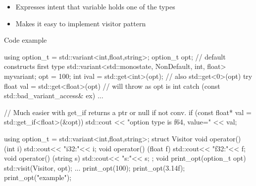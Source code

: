 \begin{frame}[fragile]
  \begin{itemize}
  \item Expresses intent that variable holds one of the types
  \item Makes it easy to implement visitor pattern
  \end{itemize}

  \begin{exampleblock}{Code example}
    \begin{cppcode*}{}
      using option_t = std::variant<int,float,string>;
      option_t opt; // default constructs first type
      std::variant<std::monostate, NonDefault, int, float> myvariant;
      opt = 100;
      int ival = std::get<int>(opt); // also std::get<0>(opt)
      try {
        float val = std::get<float>(opt) // will throw as opt is int
      } catch (const std::bad_variant_access& ex) {...}

      // Much easier with get_if returns a ptr or null if not conv.
      if (const float* val = std::get_if<float>(&opt))
          std::cout << "option type is f64, value=" << val;
    \end{cppcode*}
  \end{exampleblock}

\end{frame}

\begin{frame}[fragile]
    \begin{cppcode*}{}
      using option_t = std::variant<int,float,string>;
      struct Visitor {
        void operator() (int i) { std::cout<< "i32:"<< i;}
        void operator() (float f) { std::cout<< "f32:"<< f;}
        void operator() (string s) { std::cout<< "s:"<< s;}
      };
      void print_opt(option_t opt) {
        std::visit(Visitor{}, opt);
      }
      ...
      print_opt(100); print_opt(3.14f); print_opt("example");
    \end{cppcode*}
\end{frame}

